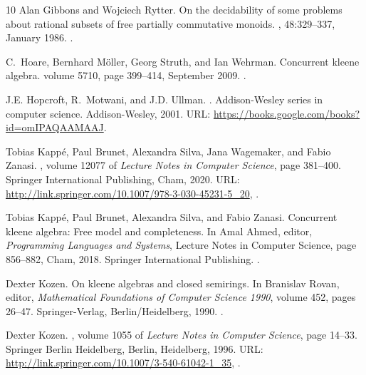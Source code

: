 \documentclass[11pt,a4paper]{amsart}
\theoremstyle{definition}
\begin{document}
\begin{thebibliography}{10}
Alan Gibbons and Wojciech Rytter.
\newblock On the decidability of some problems about rational subsets of free partially commutative monoids.
, 48:329--337, January 1986.
\newblock \href {https://doi.org/10.1016/0304-3975(86)90101-5} {}.

C.~Hoare, Bernhard Möller, Georg Struth, and Ian Wehrman.
\newblock Concurrent kleene algebra.
\newblock volume 5710, page 399–414, September 2009.
\newblock \href {https://doi.org/10.1007/978-3-642-04081-8_27} {}.

J.E. Hopcroft, R.~Motwani, and J.D. Ullman.
.
\newblock Addison-Wesley series in computer science. Addison-Wesley, 2001.
\newblock URL: \url{https://books.google.com/books?id=omIPAQAAMAAJ}.

Tobias Kappé, Paul Brunet, Alexandra Silva, Jana Wagemaker, and Fabio Zanasi.
, volume 12077 of {\em Lecture Notes in Computer Science}, page 381–400.
\newblock Springer International Publishing, Cham, 2020.
\newblock URL: \url{http://link.springer.com/10.1007/978-3-030-45231-5_20}, \href {https://doi.org/10.1007/978-3-030-45231-5_20} {}.

Tobias Kappé, Paul Brunet, Alexandra Silva, and Fabio Zanasi.
\newblock Concurrent kleene algebra: Free model and completeness.
\newblock In Amal Ahmed, editor, {\em Programming Languages and Systems}, Lecture Notes in Computer Science, page 856–882, Cham, 2018. Springer International Publishing.
\newblock \href {https://doi.org/10.1007/978-3-319-89884-1_30} {}.

Dexter Kozen.
\newblock On kleene algebras and closed semirings.
\newblock In Branislav Rovan, editor, {\em Mathematical {{Foundations}} of {{Computer Science}} 1990}, volume 452, pages 26--47. Springer-Verlag, Berlin/Heidelberg, 1990.
\newblock \href {https://doi.org/10.1007/BFb0029594} {}.

Dexter Kozen.
, volume 1055 of {\em Lecture Notes in Computer Science}, page 14–33.
\newblock Springer Berlin Heidelberg, Berlin, Heidelberg, 1996.
\newblock URL: \url{http://link.springer.com/10.1007/3-540-61042-1_35}, \href {https://doi.org/10.1007/3-540-61042-1_35} {}.


\end{thebibliography}
\end{document}
